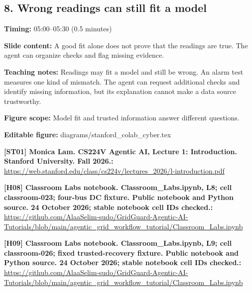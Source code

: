 \documentclass[10pt,letterpaper]{article}
\begin{document}
\subsection*{8. Wrong readings can still fit a model}
\textbf{Timing:} 05:00--05:30 (0.5 minutes)\par
\textbf{Slide content:} A good fit alone does not prove that the readings are true.
The agent can organize checks and flag missing evidence.\par
\textbf{Teaching notes:} Readings may fit a model and still be wrong. An alarm test measures one kind of mismatch. The agent can request additional checks and identify missing information, but its explanation cannot make a data source trustworthy.\par
\textbf{Figure scope:} Model fit and trusted information answer different questions.\par
\textbf{Editable figure:} diagrams/stanford\_colab\_cyber.tex\par
\textbf{[ST01] Monica Lam. CS224V Agentic AI, Lecture 1: Introduction. Stanford University. Fall 2026.:} \href{https://web.stanford.edu/class/cs224v/lectures_2026/l-introduction.pdf}{\small\ttfamily https:/\allowbreak{}/\allowbreak{}web.\allowbreak{}stanford.\allowbreak{}edu/\allowbreak{}class/\allowbreak{}cs224v/\allowbreak{}lectures\_\allowbreak{}2026/\allowbreak{}l-\allowbreak{}introduction.\allowbreak{}pdf}\par
\textbf{[H08] Classroom Labs notebook. Classroom\_Labs.ipynb, L8; cell classroom-023; four-bus DC fixture. Public notebook and Python source. 24 October 2026; stable notebook cell IDs checked.:} \href{https://github.com/AlaaSelim-sudo/GridGuard-Agentic-AI-Tutorials/blob/main/agentic_grid_workflow_tutorial/Classroom_Labs.ipynb}{\small\ttfamily https:/\allowbreak{}/\allowbreak{}github.\allowbreak{}com/\allowbreak{}AlaaSelim-\allowbreak{}sudo/\allowbreak{}GridGuard-\allowbreak{}Agentic-\allowbreak{}AI-\allowbreak{}Tutorials/\allowbreak{}blob/\allowbreak{}main/\allowbreak{}agentic\_\allowbreak{}grid\_\allowbreak{}workflow\_\allowbreak{}tutorial/\allowbreak{}Classroom\_\allowbreak{}Labs.\allowbreak{}ipynb}\par
\textbf{[H09] Classroom Labs notebook. Classroom\_Labs.ipynb, L9; cell classroom-026; fixed trusted-recovery fixture. Public notebook and Python source. 24 October 2026; stable notebook cell IDs checked.:} \href{https://github.com/AlaaSelim-sudo/GridGuard-Agentic-AI-Tutorials/blob/main/agentic_grid_workflow_tutorial/Classroom_Labs.ipynb}{\small\ttfamily https:/\allowbreak{}/\allowbreak{}github.\allowbreak{}com/\allowbreak{}AlaaSelim-\allowbreak{}sudo/\allowbreak{}GridGuard-\allowbreak{}Agentic-\allowbreak{}AI-\allowbreak{}Tutorials/\allowbreak{}blob/\allowbreak{}main/\allowbreak{}agentic\_\allowbreak{}grid\_\allowbreak{}workflow\_\allowbreak{}tutorial/\allowbreak{}Classroom\_\allowbreak{}Labs.\allowbreak{}ipynb}\par
\end{document}
